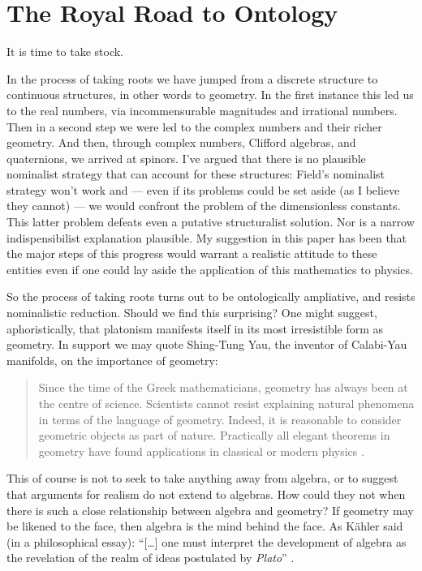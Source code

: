\documentclass[11pt,oneside,a4paper]{article}
\begin{document}
\section{The Royal Road to Ontology}

It is time to take stock. 

In the process of taking roots we have jumped from a discrete structure to continuous structures, in other words to geometry. In the first instance this led us to the real numbers, via incommensurable magnitudes and irrational numbers. Then in a second step we were led to the complex numbers and their richer geometry. And then, through complex numbers, Clifford algebras, and quaternions, we arrived at spinors. I've argued that there is no plausible nominalist strategy that can account for these structures: Field's nominalist strategy won't work and --- even if its problems could be set aside (as I believe they cannot) --- we would confront the problem of the dimensionless constants. This latter problem defeats even a putative structuralist solution. Nor is a narrow indispensibilist explanation plausible. My suggestion in this paper has been that the major steps of this progress would warrant a realistic attitude to these entities even if one could lay aside the application of this mathematics to physics.

So the process of taking roots turns out to be ontologically ampliative, and resists nominalistic reduction. Should we find this surprising? One might suggest, aphoristically, that platonism manifests itself in its most irresistible form as geometry. In support we may quote Shing-Tung Yau, the inventor of Calabi-Yau manifolds, on the importance of geometry: 
\begin{quotation}
Since the time of the Greek mathematicians, geometry has always been at the centre of science. Scientists cannot resist explaining natural phenomena in terms of the language of geometry. Indeed, it is reasonable to consider geometric objects as part of nature. Practically all elegant theorems in geometry have found applications in classical or modern physics \parencite[253]{arnold_review_2000}.
\end{quotation}
This of course is not to seek to take anything away from algebra, or to suggest that arguments for realism do not extend to algebras. How could they not when there is such a close relationship between algebra and geometry? If geometry may be likened to the face, then algebra is the mind behind the face. As Kähler said (in a philosophical essay): ``[\ldots] one must interpret the development of algebra as the revelation of the realm of ideas postulated by \textit{Plato}'' \parencite{kahler_il_2003}.
\end{document}
